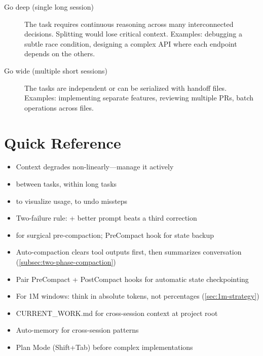 \begin{description}
  \item[Go deep (single long session)] The task requires continuous
    reasoning across many interconnected decisions. Splitting would
    lose critical context. Examples: debugging a subtle race condition,
    designing a complex API where each endpoint depends on the others.
  \item[Go wide (multiple short sessions)] The tasks are independent
    or can be serialized with handoff files. Examples: implementing
    separate features, reviewing multiple PRs, batch operations
    across files.
\end{description}


\section{Quick Reference}

\begin{itemize}
  \item Context degrades non-linearly---manage it actively
  \item {} between tasks,  within long tasks
  \item {} to visualize usage,  to undo missteps
  \item Two-failure rule:  + better prompt beats a third correction
  \item {} for surgical pre-compaction; PreCompact hook for state backup
  \item Auto-compaction clears tool outputs first, then summarizes conversation (\cref{subsec:two-phase-compaction})
  \item Pair PreCompact + PostCompact hooks for automatic state checkpointing
  \item For 1M windows: think in absolute tokens, not percentages (\cref{sec:1m-strategy})
  \item CURRENT\_WORK.md for cross-session context at project root
  \item Auto-memory for cross-session patterns
  \item Plan Mode (Shift+Tab) before complex implementations
\end{itemize}

